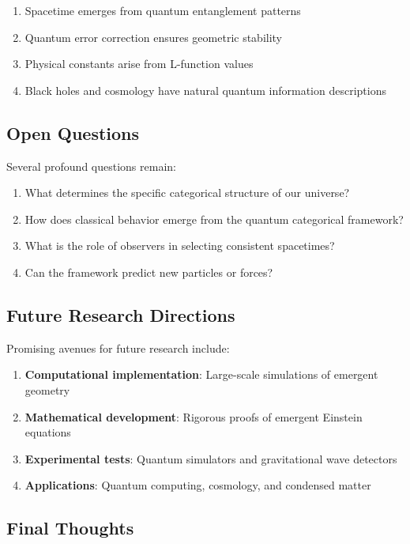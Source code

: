 \documentclass[12pt,a4paper]{article}
\theoremstyle{plain}
\theoremstyle{definition}
\theoremstyle{remark}
\begin{document}
\begin{enumerate}
\item Spacetime emerges from quantum entanglement patterns
\item Quantum error correction ensures geometric stability
\item Physical constants arise from L-function values
\item Black holes and cosmology have natural quantum information descriptions
\end{enumerate}

\subsection{Open Questions}

Several profound questions remain:

\begin{enumerate}
\item What determines the specific categorical structure of our universe?
\item How does classical behavior emerge from the quantum categorical framework?
\item What is the role of observers in selecting consistent spacetimes?
\item Can the framework predict new particles or forces?
\end{enumerate}

\subsection{Future Research Directions}

Promising avenues for future research include:

\begin{enumerate}
\item \textbf{Computational implementation}: Large-scale simulations of emergent geometry
\item \textbf{Mathematical development}: Rigorous proofs of emergent Einstein equations
\item \textbf{Experimental tests}: Quantum simulators and gravitational wave detectors
\item \textbf{Applications}: Quantum computing, cosmology, and condensed matter
\end{enumerate}

\subsection{Final Thoughts}
\end{document}
